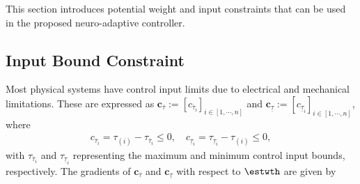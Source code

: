 \documentclass[lettersize,journal]{IEEEtran}
\begin{document}
This section introduces potential weight and input constraints that can be used in the proposed neuro-adaptive controller. 

\subsection{Input Bound Constraint}\label{sec:appen:cstr:input:bound}

Most physical systems have control input limits due to electrical and mechanical limitations. These are expressed as $\boldsymbol{c}_{\overline \tau}:= [c_{\overline \tau_i}]_{i\in[1,\cdots,n]}$ and $\boldsymbol{c}_{\underline\tau}:= [c_{\underline\tau_i}]_{i\in[1,\cdots,n]}$, where
\begin{equation}
    \begin{aligned}
        c_{\overline \tau_i}=\tau_{(i)} - {\tau_{\overline \tau_i}} \le 0
        ,
        \quad
        c_{\underline\tau_i}={\tau_{\underline\tau_i}}-\tau_{(i)} \le 0
        ,
    \end{aligned}
    \label{eq:cstr:input:bound}
\end{equation}
with $\tau_{\overline \tau_i}$ and $\tau_{\underline\tau_i}$ representing the maximum and minimum control input bounds, respectively.
The gradients of $\boldsymbol{c}_{\overline \tau}$ and $\boldsymbol{c}_{\underline\tau}$ with respect to $\estwth$ are given by
\end{document}

